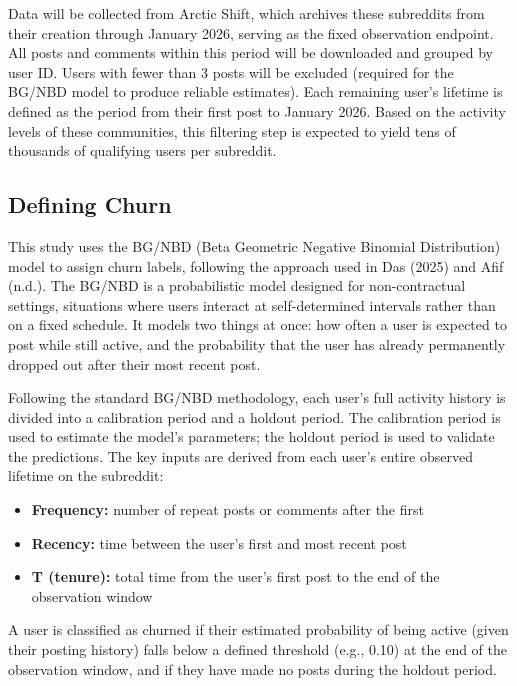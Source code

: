 \documentclass[12pt]{article}
\begin{document}
Data will be collected from Arctic Shift, which archives these subreddits from their creation through January 2026, serving as the fixed observation endpoint. All posts and comments within this period will be downloaded and grouped by user ID. Users with fewer than 3 posts will be excluded (required for the BG/NBD model to produce reliable estimates). Each remaining user's lifetime is defined as the period from their first post to January 2026. Based on the activity levels of these communities, this filtering step is expected to yield tens of thousands of qualifying users per subreddit.

\subsection*{Defining Churn}

This study uses the BG/NBD (Beta Geometric Negative Binomial Distribution) model to assign churn labels, following the approach used in Das (2025) and Afif (n.d.). The BG/NBD is a probabilistic model designed for non-contractual settings, situations where users interact at self-determined intervals rather than on a fixed schedule. It models two things at once: how often a user is expected to post while still active, and the probability that the user has already permanently dropped out after their most recent post.

Following the standard BG/NBD methodology, each user's full activity history is divided into a calibration period and a holdout period. The calibration period is used to estimate the model's parameters; the holdout period is used to validate the predictions. The key inputs are derived from each user's entire observed lifetime on the subreddit:

\begin{itemize}
    \item \textbf{Frequency:} number of repeat posts or comments after the first
    \item \textbf{Recency:} time between the user's first and most recent post
    \item \textbf{T (tenure):} total time from the user's first post to the end of the observation window
\end{itemize}

A user is classified as churned if their estimated probability of being active (given their posting history) falls below a defined threshold (e.g., 0.10) at the end of the observation window, and if they have made no posts during the holdout period.
\end{document}
